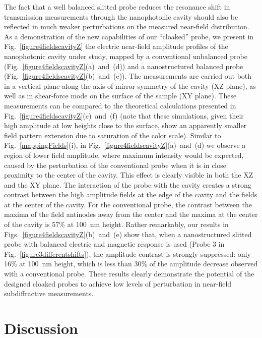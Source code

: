 \documentclass{osa-article}
\begin{document}
	The fact that a well balanced slitted probe reduces the resonance shift in transmission measurements through the nanophotonic cavity should also be reflected in much weaker perturbations on the measured near-field distribution. As a demonstration of the new capabilities of our ``cloaked'' probe, we present in Fig.~\ref{figure4fieldscavityZ} the electric near-field amplitude profiles of the nanophotonic cavity under study, mapped by a conventional unbalanced probe (Fig.~\ref{figure4fieldscavityZ}(a)~and~(d)) and a nanostructured balanced probe (Fig.~\ref{figure4fieldscavityZ}(b)~and~(e)). The measurements are carried out both in a vertical plane along the axis of mirror symmetry of the cavity (XZ plane), as well as in shear-force mode on the surface of the sample (XY plane). These measurements can be compared to the theoretical calculations presented in Fig.~\ref{figure4fieldscavityZ}(c)~and~(f) (note that these simulations, given their high amplitude at low heights close to the surface, show an apparently smaller field pattern extension due to saturation of the color scale). Similar to Fig.~\ref{mappingFields}(i), in Fig.~\ref{figure4fieldscavityZ}(a)~and~(d) we observe a region of lower field amplitude, where maximum intensity would be expected, caused by the perturbation of the conventional probe when it is in close proximity to the center of the cavity. This effect is clearly visible in both the XZ and the XY plane. The interaction of the probe with the cavity creates a strong contrast between the high amplitude fields at the edge of the cavity and the fields at the center of the cavity. For the conventional probe, the contrast between the maxima of the field antinodes away from the center and the maxima at the center of the cavity is 57\% at 100~nm height. Rather remarkably, our results in Figs.~\ref{figure4fieldscavityZ}(b)~and~(e) show that, when a nanostructured slitted probe with balanced electric and magnetic response is used (Probe 3 in Fig.~\ref{figure3differentshifts}), the amplitude contrast is strongly suppressed: only 16\% at 100~nm height, which is less than 30\% of the amplitude decrease observed with a conventional probe. These results clearly demonstrate the potential of the designed cloaked probes to achieve low levels of perturbation in near-field subdiffractive measurements.
	
	\section{Discussion}
	
\end{document}
